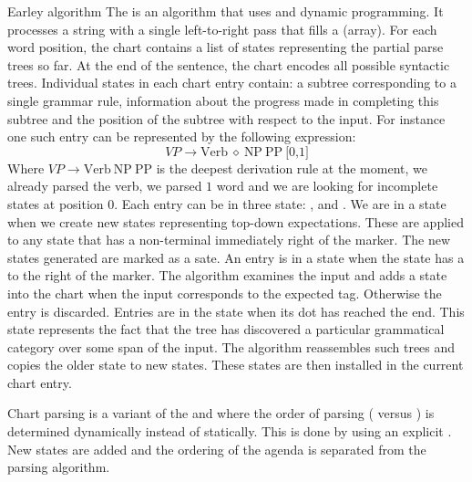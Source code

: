 \begin{df}{Earley algorithm}
The \sb{} is an algorithm that uses  and dynamic programming. It processes a string with a single left-to-right pass that fills a  (array). For each word position, the chart contains a list of states representing the partial parse trees so far. At the end of the sentence, the chart encodes all possible syntactic trees. Individual states in each chart entry contain: a subtree corresponding to a single grammar rule, information about the progress made in completing this subtree and the position of the subtree with respect to the input. For instance one such entry can be represented by the following expression:
\begin{equation}
VP\rightarrow\mbox{Verb}\ \diamond\ \mbox{NP}\ \mbox{PP}\ \mbox{[0,1]}
\end{equation}
Where $VP\rightarrow\mbox{Verb}\ \mbox{NP}\ \mbox{PP}$ is the deepest derivation rule at the moment, we already parsed the verb, we parsed $1$ word and we are looking for incomplete states at position $0$. Each entry can be in three state: ,  and . We are in a  state when we create new states representing top-down expectations. These are applied to any state that has a non-terminal immediately right of the marker. The new states generated are marked as a  sate. An entry is in a  state when the state has a  to the right of the marker. The algorithm examines the input and adds a state into the chart when the input corresponds to the expected tag. Otherwise the entry is discarded. Entries are in the  state when its dot has reached the end. This state represents the fact that the tree has discovered a particular grammatical category over some span of the input. The algorithm reassembles 
such trees and copies the older state to new states. These states are then installed in the current chart entry.
\end{df}
\begin{df}{Chart parsing}
\sb{} is a variant of the  and  where the order of parsing ( versus ) is determined dynamically instead of statically. This is done by using an explicit . New states are added and the ordering of the agenda is separated from the parsing algorithm.
\end{df}